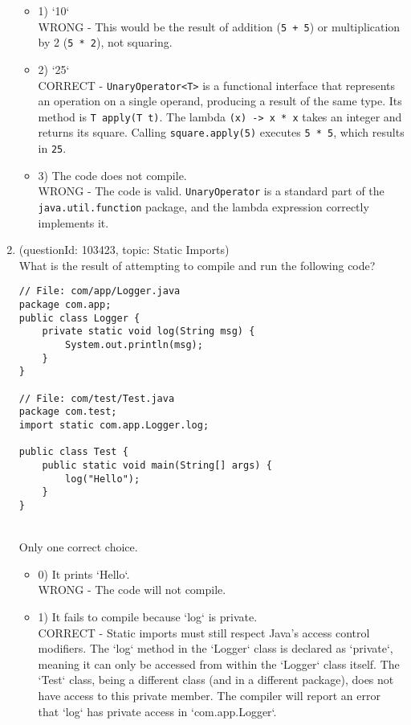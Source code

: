 \documentclass[12pt]{article}
\begin{document}
\begin{enumerate}[label=(\arabic*)]
\begin{itemize}
\item 1) `10`
 \\ 
WRONG - This would be the result of addition (\verb|5 + 5|) or multiplication by 2 (\verb|5 * 2|), not squaring.

\item 2) `25`
 \\ 
CORRECT - \verb|UnaryOperator<T>| is a functional interface that represents an operation on a single operand, producing a result of the same type. Its method is \verb|T apply(T t)|. The lambda \verb|(x) -> x * x| takes an integer and returns its square. Calling \verb|square.apply(5)| executes \verb|5 * 5|, which results in \verb|25|.

\item 3) The code does not compile.
 \\ 
WRONG - The code is valid. \verb|UnaryOperator| is a standard part of the \verb|java.util.function| package, and the lambda expression correctly implements it.

\end{itemize}
\item (questionId: 103423, topic: Static Imports) \\ 
What is the result of attempting to compile and run the following code?
\begin{verbatim}
// File: com/app/Logger.java
package com.app;
public class Logger {
    private static void log(String msg) {
        System.out.println(msg);
    }
}

// File: com/test/Test.java
package com.test;
import static com.app.Logger.log;

public class Test {
    public static void main(String[] args) {
        log("Hello");
    }
}
\end{verbatim}
\\ \noindent Only one correct choice. 
\begin{itemize}
\item 0) It prints `Hello`.
 \\ 
WRONG - The code will not compile.

\item 1) It fails to compile because `log` is private.
 \\ 
CORRECT - Static imports must still respect Java's access control modifiers. The `log` method in the `Logger` class is declared as `private`, meaning it can only be accessed from within the `Logger` class itself. The `Test` class, being a different class (and in a different package), does not have access to this private member. The compiler will report an error that `log` has private access in `com.app.Logger`.


\end{itemize}
\end{enumerate}
\end{document}

